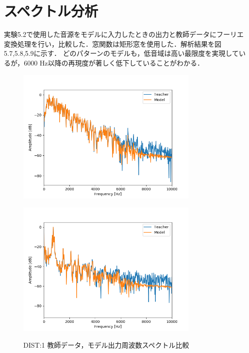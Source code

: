 \documentclass{jreport}		%
\begin{document}
\clearpage

\section{スペクトル分析}
実験5.2で使用した音源をモデルに入力したときの出力と教師データにフーリエ変換処理を行い，比較した．窓関数は矩形窓を使用した．解析結果を図5.7,5.8,5.9に示す．
どのパターンのモデルも，低音域は高い最限度を実現しているが，6000 Hz以降の再現度が著しく低下していることがわかる．

\begin{figure}[htbp]
 \begin{minipage}{0.5\hsize}
 \begin{center}
  \includegraphics[width=90mm]{gain1_fft_hikaku.png}
 \end{center}
 \label{fig:one}
 \end{minipage}
 \begin{minipage}{0.5\hsize}
 \begin{center}
  \includegraphics[width=90mm]{gain1_fft_hikaku2.png}
 \end{center}
 \label{fig:two}
 \end{minipage}
 \caption{DIST:1 教師データ，モデル出力周波数スペクトル比較}
\end{figure}
\end{document}
